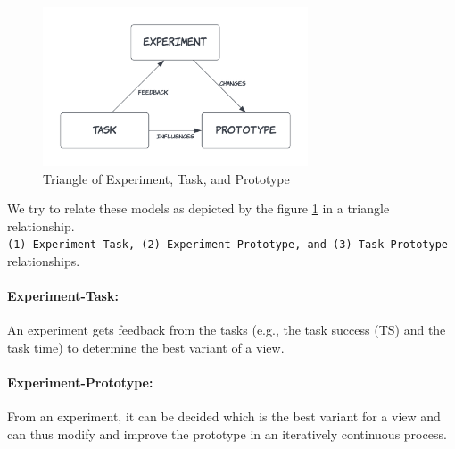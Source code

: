 \begin{figure}[h]
	\centering
  \includegraphics[width=0.7\textwidth]{images/solution-ideas/Triangle.png}
	\caption{Triangle of Experiment, Task, and Prototype}
	\label{solutionideas:fig:triangle}
\end{figure}

We try to relate these models as depicted by the figure \ref{solutionideas:fig:triangle} in a triangle relationship.\\ 
\texttt{(1) Experiment-Task, (2) Experiment-Prototype, and (3) Task-Prototype} relationships.

\paragraph{Experiment-Task:} An experiment gets feedback from the tasks (e.g., the task success (TS) and the task time) to determine the best variant of a view. 

\paragraph{Experiment-Prototype:} From an experiment, it can be decided which is the best variant for a view and can thus modify and improve the prototype in an iteratively continuous process.

